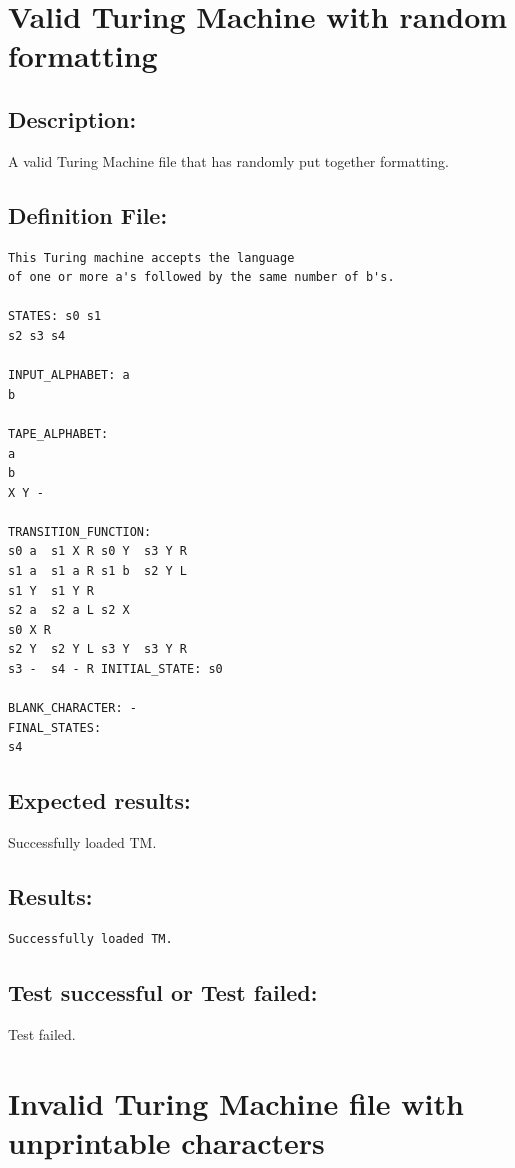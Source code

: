 \documentclass{report}
\begin{document}
\pagebreak



\chapter{Valid Turing Machine with random formatting}
     
\section{Description:} A valid Turing Machine file that has randomly put together formatting.

\section{Definition File: }
\begin{verbatim}
This Turing machine accepts the language 
of one or more a's followed by the same number of b's.

STATES: s0 s1 
s2 s3 s4
	
INPUT_ALPHABET: a 
b

TAPE_ALPHABET: 
a 
b 
X Y -

TRANSITION_FUNCTION:
s0 a  s1 X R s0 Y  s3 Y R
s1 a  s1 a R s1 b  s2 Y L
s1 Y  s1 Y R
s2 a  s2 a L s2 X  
s0 X R
s2 Y  s2 Y L s3 Y  s3 Y R
s3 -  s4 - R INITIAL_STATE: s0

BLANK_CHARACTER: -
FINAL_STATES: 
s4
\end{verbatim}
\section{Expected results:} Successfully loaded TM.
\section{Results:} 
\begin{verbatim}
Successfully loaded TM.
\end{verbatim}
\section{Test successful or Test failed:} Test failed.

\pagebreak


\chapter{Invalid Turing Machine file with unprintable characters}
     
\end{document}
